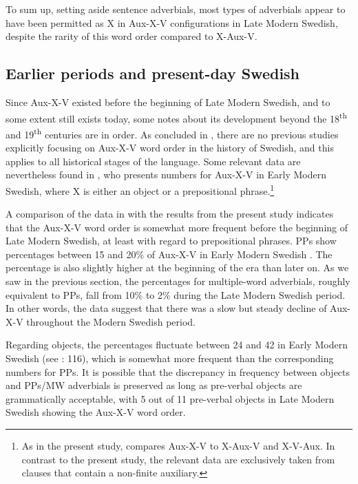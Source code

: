 \documentclass[output=paper, colorlinks, citecolor=brown]{langscibook}
\begin{document}
 To sum up, setting aside sentence adverbials, most types of adverbials appear to have been permitted as X in Aux-X-V configurations in Late Modern Swedish, despite the rarity of this word order compared to X-Aux-V.

\subsection{Earlier periods and present-day Swedish}\label{sec:sangfelt:4.3}\largerpage[2]

 Since Aux-X-V existed before the beginning of Late Modern Swedish, and to some extent still exists today, some notes about its development beyond the 18\textsuperscript{th} and 19\textsuperscript{th} centuries are in order. As concluded in , there are no previous studies explicitly focusing on Aux-X-V word order in the history of Swedish, and this applies to all historical stages of the language. Some relevant data are nevertheless found in \citet{Sangfelt2019}, who presents numbers for Aux-X-V in Early Modern Swedish, where X is either an object or a prepositional phrase.\footnote{As in the present study, \citet{Sangfelt2019} compares Aux-X-V to X-Aux-V and X-V-Aux. In contrast to the present study, the relevant data are exclusively taken from clauses that contain a non-finite auxiliary.}


A comparison of the data in \citet{Sangfelt2019} with the results from the present study indicates that the Aux-X-V word order is somewhat more frequent before the beginning of Late Modern Swedish, at least with regard to prepositional phrases. PPs show percentages between 15 and 20\% of Aux-X-V in Early Modern Swedish \citep[119]{Sangfelt2019}. The percentage is also slightly higher at the beginning of the era than later on. As we saw in the previous section, the percentages for multiple-word adverbials, roughly equivalent to PPs, fall from 10\% to 2\% during the Late Modern Swedish period. In other words, the data suggest that there was a slow but steady decline of Aux-X-V throughout the Modern Swedish period.



Regarding objects, the percentages fluctuate between 24 and 42 in Early Modern Swedish (see \citealt{Sangfelt2019}: 116), which is somewhat more frequent than the corresponding numbers for PPs. It is possible that the discrepancy in frequency between objects and PPs/MW adverbials is preserved as long as pre-verbal objects are grammatically acceptable, with 5 out of 11 pre-verbal objects in Late Modern Swedish showing the Aux-X-V word order.
\end{document}
